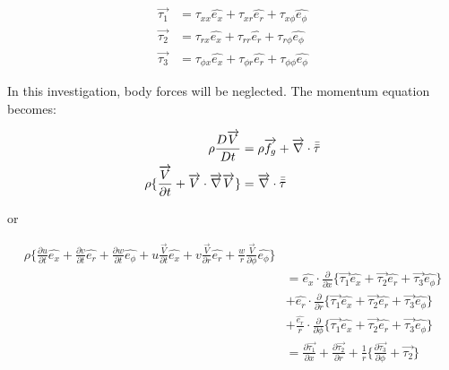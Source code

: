 \begin{equation}
  \begin{aligned}
    \overrightarrow{\tau_1} 
    &= \tau_{xx}\hat{e_x}
    + \tau_{xr}\hat{e_r}
    + \tau_{x\phi}\hat{e_\phi} \\
     \overrightarrow{\tau_2} 
    &= \tau_{rx}\hat{e_x}
    + \tau_{rr}\hat{e_r}
    + \tau_{r\phi}\hat{e_\phi} \\
     \overrightarrow{\tau_3} 
    &= \tau_{\phi x}\hat{e_x}
    + \tau_{\phi r}\hat{e_r}
    + \tau_{\phi\phi}\hat{e_\phi}
  \end{aligned}
\end{equation}

In this investigation, body forces will be neglected. The momentum equation becomes:

\begin{equation}
  \begin{aligned}
    \rho\frac{D\overrightarrow{V}}{Dt}
    &= \rho\overrightarrow{f_g} 
    + \overrightarrow{\nabla}\cdot\bar{\bar{\tau}} \\
    \rho\{\frac{\overrightarrow{V}}{\partial t} 
    + \overrightarrow{V}\cdot\overrightarrow{\nabla}\overrightarrow{V}\} 
    &= \overrightarrow{\nabla}\cdot\bar{\bar{\tau}}
  \end{aligned}
\end{equation}

or

\begin{equation}
  \begin{aligned}
  \rho \bigg\{ 
      \frac{\partial u}{\partial t}\hat{e_x} 
    + \frac{\partial v}{\partial t}\hat{e_r}
    + \frac{\partial w}{\partial t}\hat{e_\phi} 
    + u\frac{\overrightarrow{V}}{\partial t}\hat{e_x}
    + v\frac{\overrightarrow{V}}{\partial r}\hat{e_r}
    + \frac{w}{r}\frac{\overrightarrow{V}}{\partial \phi}\hat{e_\phi}
  \bigg\} \\
  &= \hat{e_x}\cdot\frac{\partial}{\partial x}
  \{
      \overrightarrow{\tau_1}\hat{e_x}
    + \overrightarrow{\tau_2}\hat{e_r}
    + \overrightarrow{\tau_3}\hat{e_\phi}
  \} \\
  &+ \hat{e_r}\cdot\frac{\partial}{\partial r}
  \{
      \overrightarrow{\tau_1}\hat{e_x}
    + \overrightarrow{\tau_2}\hat{e_r}
    + \overrightarrow{\tau_3}\hat{e_\phi}
  \} \\
  &+ \frac{\hat{e_r}}{r}\cdot\frac{\partial}{\partial \phi}
  \{
      \overrightarrow{\tau_1}\hat{e_x}
    + \overrightarrow{\tau_2}\hat{e_r}
    + \overrightarrow{\tau_3}\hat{e_\phi}
  \} \\
  &= \frac{\partial\overrightarrow{\tau_1}}{\partial x} 
    + \frac{\partial\overrightarrow{\tau_2}}{\partial r} 
    + \frac{1}{r} 
    \bigg\{
      \frac{\partial\overrightarrow{\tau_3}}{\partial \phi}  
      + \overrightarrow{\tau_2}
    \bigg\}
  \end{aligned}
\end{equation}

